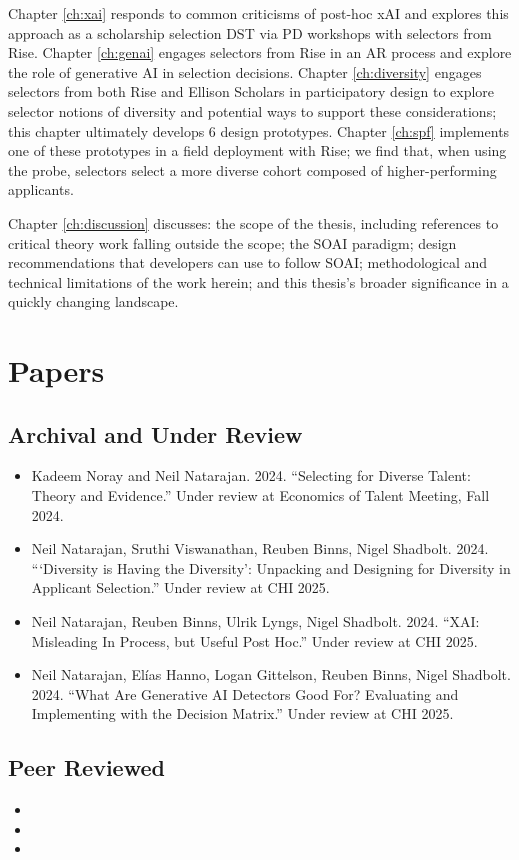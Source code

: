 Chapter \ref{ch:xai} responds to common criticisms of post-hoc xAI and explores this approach as a scholarship selection DST via PD workshops with selectors from Rise. Chapter \ref{ch:genai} engages selectors from Rise in an AR process and explore the role of generative AI in selection decisions. Chapter \ref{ch:diversity} engages selectors from both Rise and Ellison Scholars in participatory design to explore selector notions of diversity and potential ways to support these considerations; this chapter ultimately develops 6 design prototypes. Chapter \ref{ch:spf} implements one of these prototypes in a field deployment with Rise; we find that, when using the probe, selectors select a more diverse cohort composed of higher-performing applicants. 

Chapter \ref{ch:discussion} discusses: the scope of the thesis, including references to critical theory work falling outside the scope; the SOAI paradigm; design recommendations that developers can use to follow SOAI; methodological and technical limitations of the work herein; and this thesis's broader significance in a quickly changing landscape. 

\section{Papers}
\subsection{Archival and Under Review}
\begin{itemize}
    \item Kadeem Noray and Neil Natarajan. 2024. “Selecting for Diverse Talent: Theory and Evidence.” Under review at Economics of Talent Meeting, Fall 2024.
    \item Neil Natarajan, Sruthi Viswanathan, Reuben Binns, Nigel Shadbolt. 2024. “‘Diversity is Having the Diversity’: Unpacking and Designing for Diversity in Applicant Selection.” Under review at CHI 2025.
    \item Neil Natarajan, Reuben Binns, Ulrik Lyngs, Nigel Shadbolt. 2024. “XAI: Misleading In Process, but Useful Post Hoc.” Under review at CHI 2025.
    \item Neil Natarajan, Elías Hanno, Logan Gittelson, Reuben Binns, Nigel Shadbolt. 2024. “What Are Generative AI Detectors Good For? Evaluating and Implementing with the Decision Matrix.” Under review at CHI 2025.
\end{itemize}

\subsection{Peer Reviewed}
\begin{itemize}
    \item {}
    \item {} 
    \item {}
\end{itemize}



